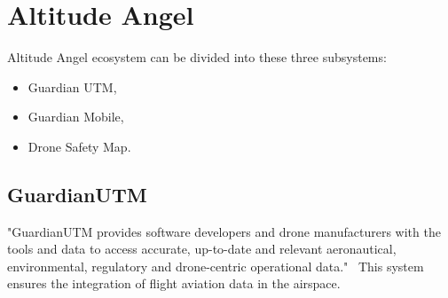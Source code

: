 \section{Altitude Angel}\label{sec:altitude-angel}
Altitude Angel ecosystem can be divided into these three subsystems:
\begin{itemize}
    \item Guardian UTM,
    \item Guardian Mobile,
    \item Drone Safety Map.
\end{itemize}

\subsection{GuardianUTM}\label{subsec:guardianutm}
"GuardianUTM provides software developers and drone manufacturers with the tools and data to access accurate, up-to-date and relevant aeronautical, environmental, regulatory and drone-centric operational data."~\cite{altitudeAngel}
This system ensures the integration of flight aviation data in the airspace.


